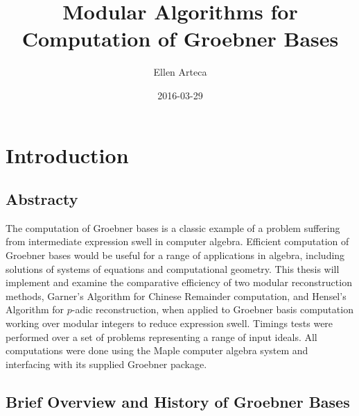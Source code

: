 \documentclass[letterpaper,12pt,titlepage,oneside,final]{book}
\begin{document}
\title{Modular Algorithms for Computation of Groebner Bases}
\date{2016-03-29}
\author{Ellen Arteca}

\frontmatter
\maketitle
\tableofcontents
\listoffigures
\mainmatter

\chapter{Introduction}

\section{Abstracty}

The computation of Groebner bases is a classic example of a problem suffering from intermediate expression swell in computer algebra.  Efficient computation of Groebner bases would be useful for a range of applications in algebra, including solutions of systems of equations and computational geometry.  This thesis will implement and examine the comparative efficiency of two modular reconstruction methods, Garner's Algorithm for Chinese Remainder computation, and Hensel's Algorithm for ${p}$-adic reconstruction, when applied to Groebner basis computation working over modular integers to reduce expression swell.  Timings tests were performed over a set of problems representing a range of input ideals.  All computations were done using the Maple computer algebra system and interfacing with its supplied Groebner package.  

\section{Brief Overview and History of Groebner Bases}
 
\end{document}
